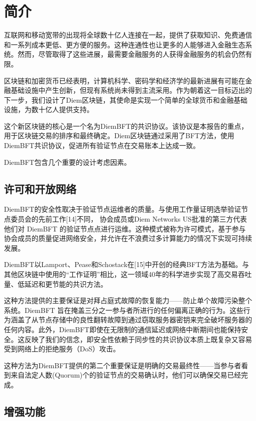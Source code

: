 \section{简介}

互联网和移动宽带的出现将全球数十亿人连接在一起，提供了获取知识、免费通信和一系列成本更低、更方便的服务。这种连通性也让更多的人能够进入金融生态系统。然而，尽管取得了这些进展，最需要金融服务的人获得金融服务的机会仍然有限。

区块链和加密货币已经表明，计算机科学、密码学和经济学的最新进展有可能在金融基础设施中产生创新，但现有系统尚未得到主流采用。作为朝着这一目标迈出的下一步，我们设计了Diem区块链，其使命是实现一个简单的全球货币和金融基础设施，为数十亿人提供支持。

这个新区块链的核心是一个名为DiemBFT的共识协议。该协议是本报告的重点，用于区块链交易的排序和最终确定。Diem区块链通过采用了BFT方法，使用DiemBFT共识协议，促进所有验证节点在交易账本上达成一致。

DiemBFT包含几个重要的设计考虑因素。

\subsection{许可和开放网络}

DiemBFT的安全性取决于验证节点运维者的质量。与使用工作量证明选举验证节点委员会的先前工作[14]不同， 协会成员或Diem Networks US批准的第三方代表他们对 DiemBFT 的验证节点点进行运维。这种模式被称为许可模式，基于参与协会成员的质量促进网络安全，并允许在不浪费过多计算能力的情况下实现可持续发展。

DiemBFT以Lamport、Pease和Schostack在[15]中开创的经典BFT方法为基础。与其他区块链中使用的“工作证明”相比，这一领域40年的科学进步实现了高交易吞吐量、低延迟和更节能的共识方法。

这种方法提供的主要保证是对拜占庭式故障的恢复能力——防止单个故障污染整个系统。DiemBFT 旨在掩盖三分之一参与者所进行的任何偏离正确的行为。这些行为涵盖了从节点存储中的良性翻转故障到通过窃取服务器密钥来完全破坏服务器的任何内容。此外，DiemBFT即使在无限制的通信延迟或网络中断期间也能保持安全。这反映了我们的信念，即安全性依赖于同步性的共识协议本质上既复杂又容易受到网络上的拒绝服务（DoS）攻击。

这种方法为DiemBFT提供的第二个重要保证是明确的交易最终性——当参与者看到来自法定人数(Quorum)个的验证节点的交易确认时，他们可以确保交易已经完成。

\subsection{增强功能}

